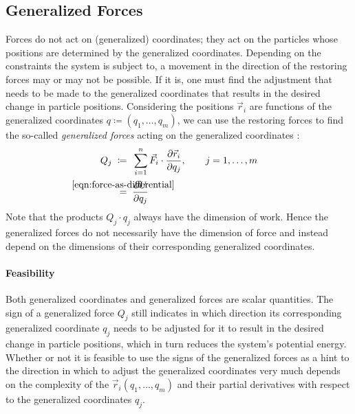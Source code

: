 \subsection{Generalized Forces}

Forces do not act on (generalized) coordinates; they act on the particles whose positions are determined by the generalized coordinates. Depending on the constraints the system is subject to, a movement in the direction of the restoring forces may or may not be possible. If it is, one must find the adjustment that needs to be made to the generalized coordinates that results in the desired change in particle positions. Considering the positions ${\vec{r}_i}$ are functions of the generalized coordinates ${q \coloneqq (q_1, \ldots, q_m)}$, we can use the restoring forces to find the so-called \emph{generalized forces} acting on the generalized coordinates \cite{Fitzpatrick}:
%
\begin{align}
  Q_j \;\coloneqq &\;\; \sum_{i=1}^{n}{\vec{F}_i \cdot \frac{\partial \vec{r}_i}{\partial q_j}}, \qquad j = 1, \ldots, m
  \label{eqn:generalized-forces-definition} \\
  \;\stackrel{\mathclap{\eqref{eqn:force-as-differential}}}{=} &\;\; \frac{\partial U}{\partial q_j}
  \label{eqn:generalized-forces-as-gradient}
\end{align}
%
Note that the products ${Q_j \cdot q_j}$ always have the dimension of work. Hence the generalized forces do not necessarily have the dimension of force and instead depend on the dimensions of their corresponding generalized coordinates.



\paragraph{Feasibility}

Both generalized coordinates and generalized forces are scalar quantities. The sign of a generalized force ${Q_j}$ still indicates in which direction its corresponding generalized coordinate ${q_j}$ needs to be adjusted for it to result in the desired change in particle positions, which in turn reduces the system's potential energy. Whether or not it is feasible to use the signs of the generalized forces as a hint to the direction in which to adjust the generalized coordinates very much depends on the complexity of the ${\vec{r}_i(q_1, \ldots, q_m)}$ and their partial derivatives with respect to the generalized coordinates ${q_j}$.

